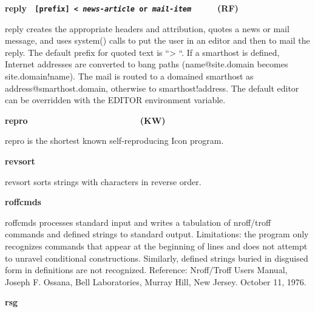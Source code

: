 {{\sffamily\bfseries
reply \ \texttt{\textmd{[prefix] {\textless}
}}\texttt{\textmd{\textit{news-article}}}\texttt{\textmd{ or
}}\texttt{\textmd{\textit{mail-item\ \ \ \ \ \  }}}(RF)}

\textsf{reply} creates the appropriate headers and attribution, quotes a
news or mail message, and uses \textsf{system()} calls to put the user
in an editor and then to mail the reply. The default
prefix for quoted text is \textsf{{\textquotedblleft}{\textgreater}
{\textquotedblleft}}. If a smarthost is defined, Internet addresses are
converted to bang paths (\textsf{name@site.domain} becomes
\textsf{site.domain!name}). The mail is routed to a domained smarthost
as \textsf{address@smarthost.domain}, otherwise to
\textsf{smarthost!address}. The default editor can be overridden with
the EDITOR environment variable. 

{\sffamily\bfseries
repro\ \ \ \ \ \ \ \ \ \ \ \ \ \ \ \ \ \ \ \ \ \  \ (KW)}

\textsf{repro} is the shortest known self-reproducing Icon program. 

{\sffamily\bfseries
revsort\ \ \ \ \ \ \ \ \ \ \ \ \ \ \ \ \ \ \ \ }

\textsf{revsort} sorts strings with characters in reverse order. 

{\sffamily\bfseries
roffcmds}

\textsf{roffcmds} processes standard input and writes a tabulation of
nroff/troff commands and defined strings to standard output.
Limitations: the program only recognizes commands that appear at the
beginning of lines and does not attempt to unravel conditional
constructions. Similarly, defined strings buried in disguised form in
definitions are not recognized. Reference: Nroff/Troff
User{\textquotesingle}s Manual, Joseph F. Ossana, Bell Laboratories,
Murray Hill, New Jersey. October 11, 1976. 

{\sffamily\bfseries
rsg\ \ \ \ \ \ \ \ \ \ \ \ \ \ \ \ \ \ \ \ \ \ }

}
